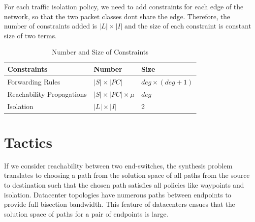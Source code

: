 \documentclass[]{sig}
\begin{document}
For each traffic isolation policy, we need to add constraints for each edge of the network, so that the two packet classes dont share the edge. Therefore, the number of constraints added is $|L| \times |I|$ and the size of each constraint is constant size of two terms.

\begin{table}[H]
\begin{center}
	\begin{tabular}{||m{6em} | m{7em} | m{7em} ||} 
		\hline
		Constraints & Number & Size \\ [0.5ex] 
		\hline\hline
		Forwarding Rules & $|S| \times |PC| $ & $deg \times (deg + 1)$ \\ [0.5ex] 
		\hline
		Reachability Propagations & $|S| \times |PC| \times \mu $ & $deg$ \\ [0.5ex] 
		\hline
		Isolation & $|L| \times |I|$ & 2 \\
		\hline
	\end{tabular}
\end{center}
\caption{Number and Size of Constraints} \label{tab:title} 
\end{table}

\section{Tactics} \label{sec:tactic}
If we consider reachability between two end-switches, the synthesis problem translates to choosing a path from the solution space of all paths from the source to destination such that the chosen path satisfies all policies like waypoints and isolation. Datacenter topologies have numerous paths between endpoints to provide full bisection bandwidth. This feature of datacenters ensues that the solution space of paths for a pair of endpoints is large. 
\end{document}
